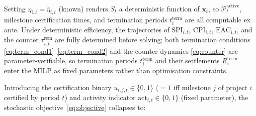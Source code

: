 Setting $\eta_{i,t} = \bar{\eta}_{i,t}$ (known) renders $S_t$ a
deterministic function of $\mathbf{x}_t$, so
$\mathcal{P}_t^{\mathrm{active}}$, milestone certification times, and
termination periods $t_i^{\mathrm{term}}$ are all computable ex ante.
Under deterministic efficiency, the trajectories of
$\mathrm{SPI}_{i,t}$, $\mathrm{CPI}_{i,t}$, $\mathrm{EAC}_{i,t}$,
and the counter $\tau_{i,t}^{\mathrm{rem}}$ are fully determined before
solving; both termination conditions
\eqref{eq:term_cond1}--\eqref{eq:term_cond2} and the counter dynamics
\eqref{eq:counter} are parameter-verifiable, so termination periods
$t_i^{\mathrm{term}}$ and their settlements $R_i^{\mathrm{term}}$ enter
the MILP as fixed parameters rather than optimisation constraints.

Introducing the certification binary $u_{i,j,t} \in \{0,1\}$ ($=1$ iff
milestone $j$ of project $i$ certified by period $t$) and activity
indicator $\mathrm{act}_{i,t} \in \{0,1\}$ (fixed parameter), the
stochastic objective~\eqref{eq:objective} collapses to:

